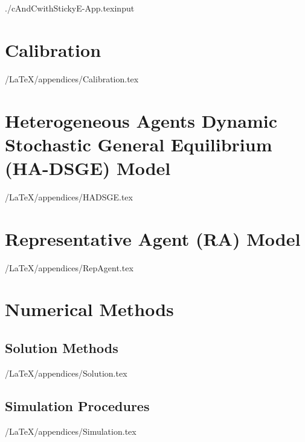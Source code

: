 \documentclass[titlepage]{\econtex}
\begin{document}
	\titlepagefinish
	\setcounter{page}{1}
	\setcounter{table}{4} %
	\setcounter{equation}{20} %
	
	\pagebreak

\appendix



\begin{verbatimwrite}{./cAndCwithStickyE-App.texinput}
  \hypertarget{Online-Appendix}{}
\hypertarget{Calibration-Appendix}{}
\section{Calibration}\label{app:Calibration}

\econtexRoot/LaTeX/appendices/Calibration.tex

\section{Heterogeneous Agents Dynamic Stochastic General Equilibrium (HA-DSGE) Model}
\label{sec:HADSGE}

\econtexRoot/LaTeX/appendices/HADSGE.tex



\section{Representative Agent (RA) Model}\label{sec:RepAgent}

\econtexRoot/LaTeX/appendices/RepAgent.tex


\section{Numerical Methods}\label{appendix:Numeric}

\subsection{Solution Methods}\label{appendix:Solution}

\econtexRoot/LaTeX/appendices/Solution.tex


\subsection{Simulation Procedures}\label{appendix:Simulation}

\econtexRoot/LaTeX/appendices/Simulation.tex



\end{verbatimwrite}
\end{document}
